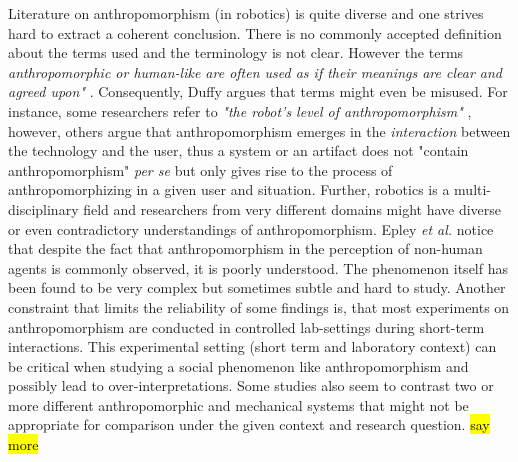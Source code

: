 \documentclass[lettersize, apacite, twoside, HRI]{apa_HRI}
\begin{document}
	Literature on anthropomorphism (in robotics) is quite diverse and one strives hard to extract a coherent conclusion. There is no commonly accepted definition about the terms used and the terminology is not clear. However the terms \textit{anthropomorphic or human-like are often used as if their meanings are clear and agreed upon"} \cite{persson_anthropomorphism_2000}. Consequently, Duffy \cite{duffy_anthropomorphism_2002} argues that terms might even be misused. For instance, some researchers refer to \textit{"the robot's level of anthropomorphism"} \cite{bartneck_is_2007}, however, others argue that anthropomorphism emerges in the \textit{interaction} between the technology and the user, thus a system or an artifact does not "contain anthropomorphism" \textit{per se} \cite{persson_anthropomorphism_2000} but only gives rise to the process of anthropomorphizing in a given user and situation. Further, robotics is a multi-disciplinary field and researchers from very different domains might have diverse or even contradictory understandings of anthropomorphism. Epley \textit{et al.} \cite{epley_seeing_2007} notice that despite the fact that anthropomorphism in the perception of non-human agents is commonly observed, it is poorly understood. The phenomenon itself has been found to be very complex but sometimes subtle and hard to study. Another constraint that limits the reliability of some findings is, that most experiments on anthropomorphism are conducted in controlled lab-settings during short-term interactions. This experimental setting (short term and laboratory context) can be critical when studying a social phenomenon like anthropomorphism and possibly lead to over-interpretations. Some studies also seem to contrast two or more different anthropomorphic and mechanical systems that might not be appropriate for comparison under the given context and research question. \hl{say more}
	
\end{document}

